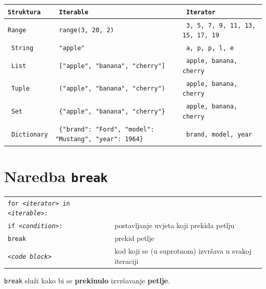 \documentclass[10pt]{article}
\begin{document}
    \section*{}
    \begin{tabular}{|>{\tt}p{2.00cm}|>{\tt}p{12.00cm}|>{\tt}p{10.00cm}|}
        \hline
        Struktura & Iterable & Iterator 
        \\ \hline
        Range & range(3, 20, 2) & 3, 5, 7, 9, 11, 13, 15, 17, 19
        \\ \hline
        String & "apple" & a, p, p, l, e
        \\ \hline
        List & ["apple", "banana", "cherry"] & apple, banana, cherry
        \\ \hline
        Tuple & ("apple", "banana", "cherry") & apple, banana, cherry
        \\ \hline             
        Set & \{"apple", "banana", "cherry"\} & apple, banana, cherry
        \\ \hline
        Dictionary & \{"brand": "Ford", "model": "Mustang", "year": 1964\} & brand, model, year
        \\ \hline
    \end{tabular}

    \section*{\color{NavyBlue} Naredba \texttt{\textbf{break}}}
    \begin{tabular}{|>{\tt}p{9.00cm}|>{}p{15.50cm}|}
        \hline
        for \textit{<iterator>} in \textit{<iterable>}:     &                                                                                                       \\
        \hspace{5mm}if \textit{<condition>}:              & postavljanje uvjeta koji prekida petlju                                                               \\ 
        \hspace{5mm}break                                   & prekid petlje                                                                                         \\ 
        \hspace{5mm}\textit{<code block>}                   & kod koji se (u suprotnom) izvršava u svakoj iteraciji                                                 \\                             
        \hline
    \end{tabular}
    \begin{center}
        \footnotesize
        \texttt{break} služi kako bi se \textbf{prekinulo} izvršavanje \textbf{petlje}.
    \end{center}
\end{document}
